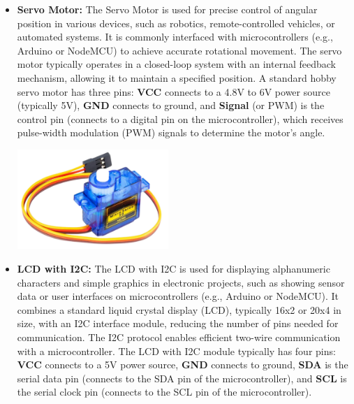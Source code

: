 \documentclass[conference, onecolumn]{IEEEtran}
\begin{document}
\begin{itemize}
\vspace{8em}
    \item \textbf{Servo Motor:} The Servo Motor is used for precise control of angular position in various devices, such as robotics, remote-controlled vehicles, or automated systems. It is commonly interfaced with microcontrollers (e.g., Arduino or NodeMCU) to achieve accurate rotational movement. The servo motor typically operates in a closed-loop system with an internal feedback mechanism, allowing it to maintain a specified position. A standard hobby servo motor has three pins: \textbf{VCC} connects to a 4.8V to 6V power source (typically 5V), \textbf{GND} connects to ground, and \textbf{Signal} (or PWM) is the control pin (connects to a digital pin on the microcontroller), which receives pulse-width modulation (PWM) signals to determine the motor’s angle.

    \begin{center}
    \includegraphics[width=0.45\textwidth]{IOT-Color-Based Object Sorting Machine/Servo_Moto.jpg} %
     \vspace{1em}
    \label{fig5}
    \end{center}
\clearpage

    \item \textbf{LCD with I2C:} The LCD with I2C is used for displaying alphanumeric characters and simple graphics in electronic projects, such as showing sensor data or user interfaces on microcontrollers (e.g., Arduino or NodeMCU). It combines a standard liquid crystal display (LCD), typically 16x2 or 20x4 in size, with an I2C interface module, reducing the number of pins needed for communication. The I2C protocol enables efficient two-wire communication with a microcontroller. The LCD with I2C module typically has four pins: \textbf{VCC} connects to a 5V power source, \textbf{GND} connects to ground, \textbf{SDA} is the serial data pin (connects to the SDA pin of the microcontroller), and \textbf{SCL} is the serial clock pin (connects to the SCL pin of the microcontroller).


\end{itemize}
\end{document}
